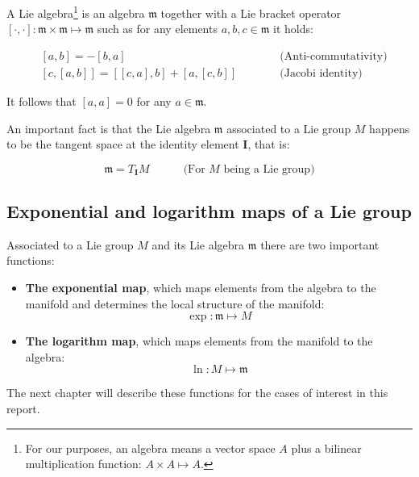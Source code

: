 \documentclass[a4paper,11pt]{report}
\begin{document}
A Lie algebra\footnote{For our purposes, an algebra means a vector space $A$ plus
a bilinear multiplication function: $A \times A \mapsto A$.}
is an algebra $\mathfrak{m}$ together with a Lie bracket operator
$[\cdot,\cdot]: \mathfrak{m} \times \mathfrak{m} \mapsto \mathfrak{m}$
such as for any elements $a,b,c \in \mathfrak{m}$
it holds:

\begin{eqnarray}
 & [a,b] = -[b,a]   & \quad\quad\quad \text{(Anti-commutativity)} \\
 & \left[ c, \left[a,b \right] \right] =
\left[ \left[c,a\right] , b \right] +
\left[ a,\left[c,b\right] \right]  &  \quad\quad\quad \text{(Jacobi identity)}
\end{eqnarray}

It follows that $[a,a]=0$ for any $a \in \mathfrak{m}$.

An important fact is that the Lie algebra $\mathfrak{m}$
associated to a Lie group $M$ happens to be the tangent
space at the identity element $\mathbf{I}$, that is:

\begin{equation}
 \mathfrak{m} = T_\mathbf{I} M   \quad\quad\quad\text{(For $M$ being a Lie group)}
\end{equation}



\subsection{Exponential and logarithm maps of a Lie group}
\label{sect:exp_ln}

Associated to a Lie group $M$ and its
Lie algebra $\mathfrak{m}$ there are
two important functions:

\begin{itemize}
\item{\textbf{The exponential map}, which maps elements from
the algebra to the manifold and determines the local structure
of the manifold:
\begin{equation}
 \exp: \mathfrak{m}  \mapsto M
\end{equation}
}
\item{\textbf{The logarithm map}, which maps elements from
the manifold to the algebra:
\begin{equation}
 \ln: M  \mapsto \mathfrak{m}
\end{equation}
}
\end{itemize}

The next chapter will describe these functions for
the cases of interest in this report.
\end{document}
